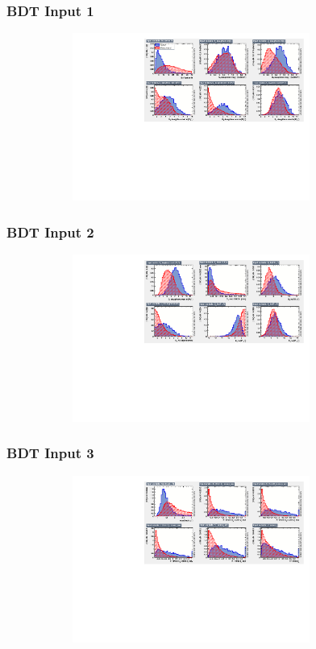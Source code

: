\documentclass[]{beamer}
\begin{document}
\begin{frame}
\frametitle{BDT Input 1}

\begin{figure}
\includegraphics[width=10.0cm,height=5.5cm]{pics/BDT_Input_12_1}
\end{figure}

\end{frame}
\begin{frame}
\frametitle{BDT Input 2}

\begin{figure}
\includegraphics[width=10.0cm,height=5.5cm]{pics/BD_Input_12_2}
\end{figure}

\end{frame}

\begin{frame}
\frametitle{BDT Input 3}

\begin{figure}
\includegraphics[width=10.0cm,height=5.5cm]{pics/BDT_Input_12_3}
\end{figure}

\end{frame}
\end{document}

